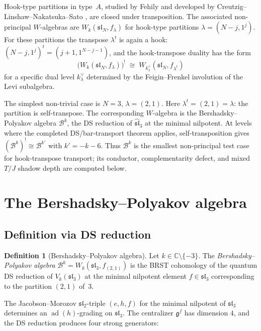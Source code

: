 \documentclass[11pt]{article}
\theoremstyle{plain}
\theoremstyle{definition}
\newtheorem{definition}[theorem]{Definition}
\theoremstyle{remark}
\newcommand{\fg}{\mathfrak{g}}
\newcommand{\fsl}{\mathfrak{sl}}
\newcommand{\cB}{\mathcal{B}}
\DeclareMathOperator{\ad}{ad}
\numberwithin{equation}{section}
\begin{document}
Hook-type partitions in type~$A$, studied by Fehily
\cite{FehilyHook} and developed by Creutzig--Linshaw--Nakatsuka--Sato
\cite{CLNS24}, are closed under transposition. The associated
non-principal $W$-algebras are
$W_k(\fsl_N, f_\lambda)$ for hook-type partitions
$\lambda = (N-j, 1^j)$. For these partitions the transpose
$\lambda^t$ is again a hook: $(N-j, 1^j)^t = (j+1, 1^{N-j-1})$, and
the hook-transpose duality has the form
\begin{equation}\label{eq:transport-duality}
 \bigl(W_k(\fsl_N, f_\lambda)\bigr)^!
 \;\cong\;
 W_{k^\vee_\lambda}(\fsl_N, f_{\lambda^t})
\end{equation}
for a specific dual level $k^\vee_\lambda$ determined by the
Feigin--Frenkel involution of the Levi subalgebra.

The simplest non-trivial case is $N=3$, $\lambda = (2,1)$. Here
$\lambda^t = (2,1) = \lambda$: the partition is self-transpose. The
corresponding $W$-algebra is the Bershadsky--Polyakov algebra
$\cB^k$, the DS reduction of $\widehat{\fsl}_3$ at the minimal
nilpotent. At levels where the completed DS/bar-transport theorem
applies, self-transposition gives
$(\cB^k)^! \cong \cB^{k'}$ with $k'=-k-6$. Thus $\cB^k$ is the
smallest non-principal test case for hook-transpose transport; its
conductor, complementarity defect, and mixed $T/J$ shadow depth are
computed below.

\section{The Bershadsky--Polyakov algebra}\label{sec:bp-algebra}

\subsection{Definition via DS reduction}

\begin{definition}[Bershadsky--Polyakov algebra]\label{def:bp}
Let $k \in \mathbb{C} \setminus \{-3\}$. The \emph{Bershadsky--Polyakov
algebra} $\cB^k = W_k(\fsl_3, f_{(2,1)})$ is the BRST cohomology
of the quantum DS reduction of $V_k(\fsl_3)$ at the minimal nilpotent
element $f \in \fsl_3$ corresponding to the partition $(2,1)$ of~$3$.
\end{definition}

The Jacobson--Morozov $\fsl_2$-triple $(e,h,f)$ for the minimal nilpotent
of $\fsl_3$ determines an $\ad(h)$-grading on $\fsl_3$. The
centralizer $\fg^f$ has dimension $4$, and the DS reduction produces
four strong generators:
\end{document}
